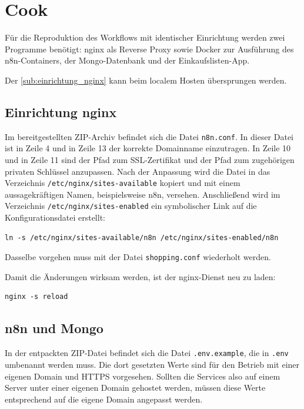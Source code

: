 \section{Cook}\label{sec:cook} %
Für die Reproduktion des Workflows mit identischer Einrichtung werden zwei Programme benötigt: nginx
als Reverse Proxy sowie Docker zur Ausführung des n8n-Containers, der Mongo-Datenbank und der
Einkaufslisten-App.

Der \autoref{sub:einrichtung_nginx} kann beim localem Hosten übersprungen werden.

\subsection{Einrichtung nginx}\label{sub:einrichtung_nginx} %
Im bereitgestellten ZIP-Archiv befindet sich die Datei \verb|n8n.conf|. In dieser Datei ist in Zeile 4
und in Zeile 13 der korrekte Domainname einzutragen. In Zeile 10 und in Zeile 11 sind der Pfad zum
SSL-Zertifikat und der Pfad zum zugehörigen privaten Schlüssel anzupassen. Nach der Anpassung wird
die Datei in das Verzeichnis \verb|/etc/nginx/sites-available| kopiert und mit einem aussagekräftigen
Namen, beispielsweise n8n, versehen. Anschließend wird im Verzeichnis
\verb|/etc/nginx/sites-enabled| ein
symbolischer Link auf die Konfigurationsdatei erstellt:

\begin{verbatim}
ln -s /etc/nginx/sites-available/n8n /etc/nginx/sites-enabled/n8n
\end{verbatim}

Dasselbe vorgehen muss mit der Datei \verb|shopping.conf| wiederholt werden.

Damit die Änderungen wirksam werden, ist der nginx-Dienst neu zu laden:

\begin{verbatim}
nginx -s reload
\end{verbatim}

\subsection{n8n und Mongo}\label{sub:n_n_und_mongo} %
In der entpackten ZIP-Datei befindet sich die Datei \verb|.env.example|, die in \verb|.env|
umbenannt werden muss. Die dort gesetzten Werte sind für den Betrieb mit einer eigenen Domain und
HTTPS vorgesehen. Sollten die Services also auf einem Server unter einer eigenen Domain gehostet
werden, müssen diese Werte entsprechend auf die eigene Domain angepasst werden.

